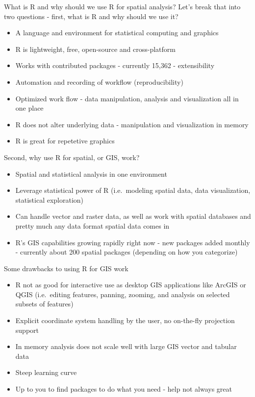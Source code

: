 \documentclass[
]{book}
\providecommand{\tightlist}{%
  \setlength{\itemsep}{0pt}\setlength{\parskip}{0pt}}
\begin{document}
What is R and why should we use R for spatial analysis? Let's break that into two questions - first, what is R and why should we use it?

\begin{itemize}
\tightlist
\item
  A language and environment for statistical computing and graphics
\item
  R is lightweight, free, open-source and cross-platform
\item
  Works with contributed packages - currently 15,362 - extensibility
\item
  Automation and recording of workflow (reproducibility)
\item
  Optimized work flow - data manipulation, analysis and visualization all in one place
\item
  R does not alter underlying data - manipulation and visualization in memory
\item
  R is great for repetetive graphics
\end{itemize}

Second, why use R for spatial, or GIS, work?

\begin{itemize}
\tightlist
\item
  Spatial and statistical analysis in one environment
\item
  Leverage statistical power of R (i.e.~modeling spatial data, data visualization, statistical exploration)
\item
  Can handle vector and raster data, as well as work with spatial databases and pretty much any data format spatial data comes in
\item
  R's GIS capabilities growing rapidly right now - new packages added monthly - currently about 200 spatial packages (depending on how you categorize)
\end{itemize}

Some drawbacks to using R for GIS work

\begin{itemize}
\tightlist
\item
  R not as good for interactive use as desktop GIS applications like ArcGIS or QGIS (i.e.~editing features, panning, zooming, and analysis on selected subsets of features)
\item
  Explicit coordinate system handling by the user, no on-the-fly projection support
\item
  In memory analysis does not scale well with large GIS vector and tabular data
\item
  Steep learning curve
\item
  Up to you to find packages to do what you need - help not always great
\end{itemize}
\end{document}
